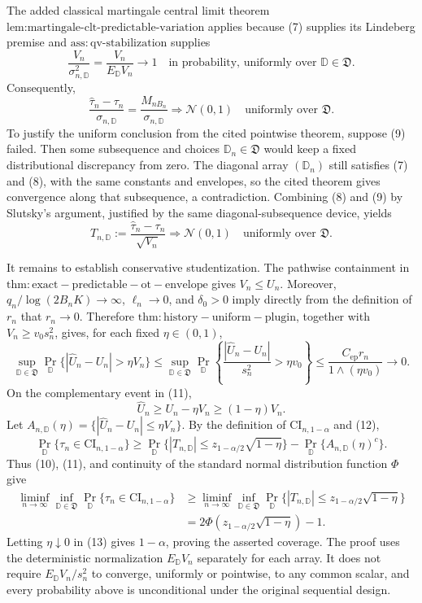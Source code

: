 The added classical martingale central limit theorem \(\text{lem:martingale-clt-predictable-variation}\) applies because (7) supplies its Lindeberg premise and \(\mathrm{ass:qv\text{-}stabilization}\) supplies
\[
\frac{V_n}{\sigma_{n,\mathbb D}^2}
=\frac{V_n}{E_{\mathbb D}V_n}\longrightarrow1
\quad\text{in probability, uniformly over }\mathbb D\in\mathfrak D.
\tag{8}
\]
Consequently,
\[
\frac{\widehat\tau_n-\tau_n}{\sigma_{n,\mathbb D}}
=\frac{M_{nB_n}}{\sigma_{n,\mathbb D}}
\Rightarrow\mathcal N(0,1)
\quad\text{uniformly over }\mathfrak D.
\tag{9}
\]
To justify the uniform conclusion from the cited pointwise theorem, suppose (9) failed.  Then some subsequence and choices \(\mathbb D_n\in\mathfrak D\) would keep a fixed distributional discrepancy from zero.  The diagonal array \((\mathbb D_n)\) still satisfies (7) and (8), with the same constants and envelopes, so the cited theorem gives convergence along that subsequence, a contradiction.  Combining (8) and (9) by Slutsky's argument, justified by the same diagonal-subsequence device, yields
\[
T_{n,\mathbb D}:=\frac{\widehat\tau_n-\tau_n}{\sqrt{V_n}}
\Rightarrow\mathcal N(0,1)
\quad\text{uniformly over }\mathfrak D.
\tag{10}
\]

It remains to establish conservative studentization.  The pathwise containment in \(\mathrm{thm:exact-predictable-ot-envelope}\) gives \(V_n\le U_n\).  Moreover, \(q_n/\log(2B_nK)\to\infty\), \(\ell_n\to0\), and \(\delta_0>0\) imply directly from the definition of \(r_n\) that \(r_n\to0\).  Therefore \(\mathrm{thm:history-uniform-plugin}\), together with \(V_n\ge v_0s_n^2\), gives, for each fixed \(\eta\in(0,1)\),
\[
\sup_{\mathbb D\in\mathfrak D}
\Pr_{\mathbb D}\{|\widehat U_n-U_n|>\eta V_n\}
\le
\sup_{\mathbb D\in\mathfrak D}
\Pr_{\mathbb D}\left\{\frac{|\widehat U_n-U_n|}{s_n^2}>\eta v_0\right\}
\le\frac{C_{\mathrm{ep}}r_n}{1\wedge(\eta v_0)}
\longrightarrow0.
\tag{11}
\]
On the complementary event in (11),
\[
\widehat U_n\ge U_n-\eta V_n\ge(1-\eta)V_n.
\tag{12}
\]
Let \(A_{n,\mathbb D}(\eta)=\{|\widehat U_n-U_n|\le\eta V_n\}\).  By the definition of \(\mathrm{CI}_{n,1-\alpha}\) and (12),
\[
\Pr_{\mathbb D}\{\tau_n\in\mathrm{CI}_{n,1-\alpha}\}
\ge
\Pr_{\mathbb D}\{|T_{n,\mathbb D}|\le z_{1-\alpha/2}\sqrt{1-\eta}\}
-\Pr_{\mathbb D}\{A_{n,\mathbb D}(\eta)^c\}.
\]
Thus (10), (11), and continuity of the standard normal distribution function \(\Phi\) give
\[
\begin{aligned}
\liminf_{n\to\infty}\inf_{\mathbb D\in\mathfrak D}
\Pr_{\mathbb D}\{\tau_n\in\mathrm{CI}_{n,1-\alpha}\}
&\ge
\liminf_{n\to\infty}\inf_{\mathbb D\in\mathfrak D}
\Pr_{\mathbb D}\{|T_{n,\mathbb D}|\le z_{1-\alpha/2}\sqrt{1-\eta}\}\\
&=2\Phi\!\left(z_{1-\alpha/2}\sqrt{1-\eta}\right)-1.
\end{aligned}
\tag{13}
\]
Letting \(\eta\downarrow0\) in (13) gives \(1-\alpha\), proving the asserted coverage.  The proof uses the deterministic normalization \(E_{\mathbb D}V_n\) separately for each array.  It does not require \(E_{\mathbb D}V_n/s_n^2\) to converge, uniformly or pointwise, to any common scalar, and every probability above is unconditional under the original sequential design.